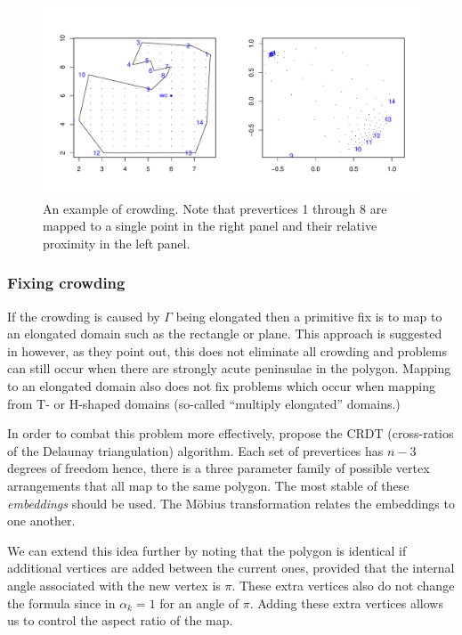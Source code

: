 \begin{figure} [tbp]
\centering
\includegraphics[scale=0.5]{sc/figs/crowdeddisk.pdf}
\caption{An example of crowding. Note that prevertices 1 through 8 are mapped to a single point in the right panel and their relative proximity in the left panel.}
\label{crowdeddisk}
\end{figure}

\subsubsection{Fixing crowding}

If the crowding is caused by $\Gamma$ being elongated then a  primitive fix is to map to an elongated domain such as the rectangle or plane. This approach is suggested in \cite{howell90} however, as they point out, this does not eliminate all crowding and problems can still occur when there are strongly acute peninsulae in the polygon. Mapping to an elongated domain also does not fix problems which occur when mapping from T- or H-shaped domains (so-called ``multiply elongated'' domains.)

In order to combat this problem more effectively, \cite{vavasis96} propose the CRDT (cross-ratios of the Delaunay triangulation) algorithm. Each set of prevertices has $n-3$ degrees of freedom hence, there is a three parameter family of possible vertex arrangements that all map to the same polygon. The most stable of these \emph{embeddings} should be used. The M\"{o}bius transformation relates the embeddings to one another.

We can extend this idea further by noting that the polygon is identical if additional vertices are added between the current ones, provided that the internal angle associated with the new vertex is $\pi$. These extra vertices also do not change the \sch formula since in  $\alpha_k=1$ for an angle of $\pi$. Adding these extra vertices allows us to control the aspect ratio of the map.

